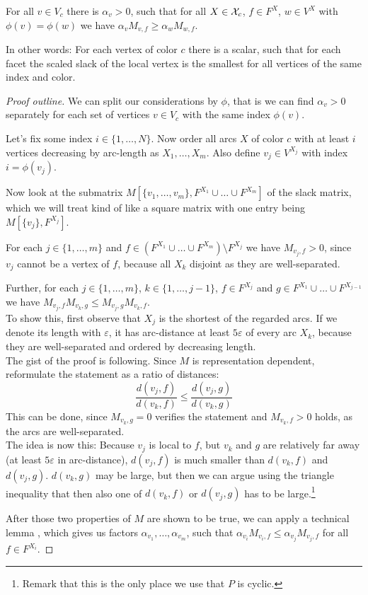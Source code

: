 \begin{lemma}\label{lemma:alphas}
  For all $v \in V_c$ there is $\alpha_v > 0$, such that for all $X \in \mathcal{X}_c$, $f \in F^X$, $w \in V^X$ with $\phi(v)=\phi(w)$ we have $\alpha_v M_{v,f} \geq \alpha_w M_{w,f}$.
\end{lemma}

In other words: For each vertex of color $c$ there is a scalar, such that for each facet the scaled slack of the local vertex is the smallest for all vertices of the same index and color.

\begin{proof}[Proof outline]
  We can split our considerations by $\phi$, that is we can find $\alpha_v > 0$ separately for each set of vertices $v \in V_c$ with the same index $\phi(v)$.

  Let's fix some index $i \in \{1,\dots,N\}$. Now order all arcs $X$ of color $c$ with at least $i$ vertices decreasing by arc-length as $X_1,\dots,X_m$. Also define $v_j \in V^{X_j}$ with index $i = \phi(v_j)$.

  Now look at the submatrix $M \left[ \{v_1, \dots, v_m\},F^{X_1} \cup \dots \cup F^{X_m} \right]$ of the slack matrix, which we will treat kind of like a square matrix with one entry being $M \left[ \{v_j\},F^{X_j} \right]$.

  For each $j \in \{1,\dots,m\}$ and $f \in (F^{X_1} \cup \dots \cup F^{X_m}) \setminus F^{X_j}$ we have $M_{v_j, f} > 0$, since $v_j$ cannot be a vertex of $f$, because all $X_k$ disjoint as they are well-separated.

  Further, for each $j \in \{1,\dots,m\}$, $k \in \{1,\dots,j-1\}$, $f \in F^{X_j}$ and $g \in F^{X_1} \cup \dots \cup F^{X_{j-1}}$ we have $M_{v_j,f}M_{v_k,g} \leq M_{v_j,g}M_{v_k,f}$. \\
  To show this, first observe that $X_j$ is the shortest of the regarded arcs. If we denote its length with $\varepsilon$, it has arc-distance at least $5\varepsilon$ of every arc $X_k$, because they are well-separated and ordered by decreasing length.\\
  The gist of the proof is following. Since $M$ is representation dependent, reformulate the statement as a ratio of distances:
  $$\frac{d(v_j,f)}{d(v_k,f)} \leq \frac{d(v_j,g)}{d(v_k,g)}$$
  This can be done, since $M_{v_k,g} = 0$ verifies the statement and $M_{v_k,f} > 0$ holds, as the arcs are well-separated.\\
  The idea is now this: Because $v_j$ is local to $f$, but $v_k$ and $g$ are relatively far away (at least $5\varepsilon$ in arc-distance), $d(v_j,f)$ is much smaller than $d(v_k,f)$ and $d(v_j,g)$. $d(v_k,g)$ may be large, but then we can argue using the triangle inequality that then also one of $d(v_k,f)$ or $d(v_j,g)$ has to be large.\footnote{Remark that this is the only place we use that $P$ is cyclic.}

  After those two properties of $M$ are shown to be true, we can apply a technical lemma \cite[Lemma~10.3]{kwan2020extension}, which gives us factors $\alpha_{v_1}, \dots, \alpha_{v_m}$, such that $\alpha_{v_i} M_{v_i,f} \leq \alpha_{v_j} M_{v_j,f}$ for all $f \in F^{X_i}$.
\end{proof}

